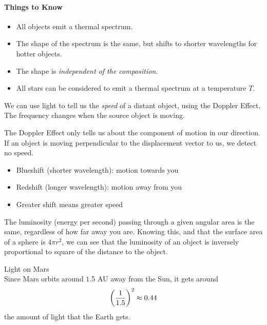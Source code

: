 \documentclass[class=article, crop=false]{standalone}
\begin{document}
  \paragraph{Things to Know}
  \begin{itemize}
    \item All objects emit a thermal spectrum.
    \item The shape of the spectrum is the same, but shifts to shorter wavelengths for hotter objects.
    \item The shape is \emph{independent of the composition}.
    \item All stars can be considered to emit a thermal spectrum at a temperature $T$.
  \end{itemize}
  We can use light to tell us the \emph{speed} of a distant object, using the Doppler Effect. The frequency changes when the source object is moving.
  \begin{note}{}
    The Doppler Effect only tells us about the component of motion in our direction. If an object is moving perpendicular to the displacement vector to us, we detect no speed.
  \end{note}
  \begin{itemize}
    \item Blueshift (shorter wavelength): motion towards you
    \item Redshift (longer wavelength): motion away from you
    \item Greater shift means greater speed
  \end{itemize}
  The luminosity (energy per second) passing through a given angular area is the same, regardless of how far away you are. Knowing this, and that the surface area of a sphere is $4\pi r^2$, we can see that the luminosity of an object is inversely proportional to square of the distance to the object.
  \begin{example}{Light on Mars} \\
    Since Mars orbits around $1$.5 AU away from the Sun, it gets around
    \[
      \left( \frac{1}{1.5} \right)^2 \approx 0.44
    \]
    the amount of light that the Earth gets.
  \end{example}
\end{document}
